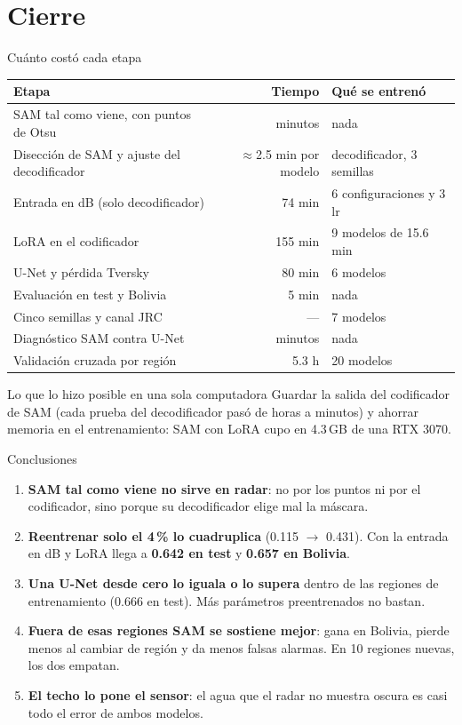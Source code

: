 \documentclass[10pt,aspectratio=1610]{beamer}
\begin{document}
\section{Cierre}

\begin{frame}{Cuánto costó cada etapa}
  \centering\small
  \begin{tabular}{@{}lrl@{}}
    \toprule
    Etapa & Tiempo & Qué se entrenó \\ \midrule
    SAM tal como viene, con puntos de Otsu & minutos & nada \\
    Disección de SAM y ajuste del decodificador & $\approx$2.5 min por modelo & decodificador, 3 semillas \\
    Entrada en dB (solo decodificador) & 74 min & 6 configuraciones y 3 lr \\
    LoRA en el codificador & 155 min & 9 modelos de 15.6 min \\
    U-Net y pérdida Tversky & 80 min & 6 modelos \\
    Evaluación en test y Bolivia & 5 min & nada \\
    Cinco semillas y canal JRC & --- & 7 modelos \\
    Diagnóstico SAM contra U-Net & minutos & nada \\
    Validación cruzada por región & 5.3 h & 20 modelos \\
    \bottomrule
  \end{tabular}

  \vspace{4mm}
  \begin{block}{Lo que lo hizo posible en una sola computadora}
    \small Guardar la salida del codificador de SAM (cada prueba del decodificador pasó de horas a minutos) y ahorrar memoria en el entrenamiento: SAM con LoRA cupo en 4.3\,GB de una RTX 3070.
  \end{block}
\end{frame}

\begin{frame}{Conclusiones}
  \begin{enumerate}
    \item \textbf{SAM tal como viene no sirve en radar}: no por los puntos ni por el codificador, sino porque su decodificador elige mal la máscara.
    \item \textbf{Reentrenar solo el 4\,\% lo cuadruplica} (0.115 $\rightarrow$ 0.431). Con la entrada en dB y LoRA llega a \textbf{0.642 en test} y \textbf{0.657 en Bolivia}.
    \item \textbf{Una U-Net desde cero lo iguala o lo supera} dentro de las regiones de entrenamiento (0.666 en test). Más parámetros preentrenados no bastan.
    \item \textbf{Fuera de esas regiones SAM se sostiene mejor}: gana en Bolivia, pierde menos al cambiar de región y da menos falsas alarmas. En 10 regiones nuevas, los dos empatan.
    \item \textbf{El techo lo pone el sensor}: el agua que el radar no muestra oscura es casi todo el error de ambos modelos.
  \end{enumerate}
\end{frame}
\end{document}
